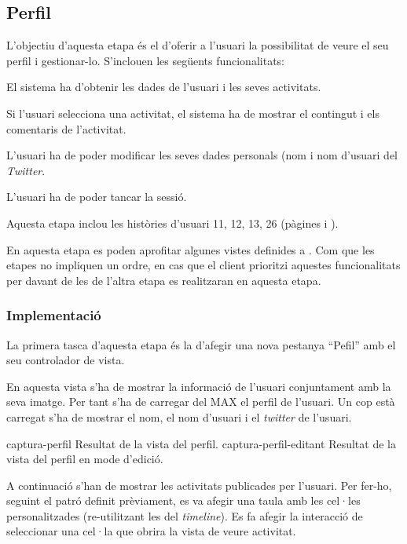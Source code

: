 \subsection{Perfil}

L'objectiu d'aquesta etapa és el d'oferir a l'usuari la possibilitat de veure el seu perfil i gestionar-lo.  S'inclouen les següents funcionalitats:

\begin{compactitem}
    \item El sistema ha d'obtenir les dades de l'usuari i les seves activitats.
    \item Si l'usuari selecciona una activitat, el sistema ha de mostrar el contingut i els comentaris de l'activitat.
    \item L'usuari ha de poder modificar les seves dades personals (nom i nom d'usuari del \textit{Twitter}.
    \item L'usuari ha de poder tancar la sessió.
\end{compactitem}

Aquesta etapa inclou les històries d'usuari 11, 12, 13, 26 (pàgines \pageref{sec:historia_11} i \pageref{sec:historia_26}).

En aquesta etapa es poden aprofitar algunes vistes definides a . Com que les etapes no impliquen un ordre, en cas que el client prioritzi aquestes funcionalitats per davant de les de l'altra etapa es realitzaran en aquesta etapa.

\subsubsection{Implementació}

La primera tasca d'aquesta etapa és la d'afegir una nova pestanya ``Pefil'' amb el seu controlador de vista.

En aquesta vista s'ha de mostrar la informació de l'usuari conjuntament amb la seva imatge. Per tant s'ha de carregar del MAX el perfil de l'usuari. Un cop està carregat s'ha de mostrar el nom, el nom d'usuari i el \textit{twitter} de l'usuari.

\pintaDosImatges
    {captura-perfil}
        {Resultat de la vista del perfil.}
    {captura-perfil-editant}
        {Resultat de la vista del perfil en mode d'edició.}
        
A continuació s'han de mostrar les activitats publicades per l'usuari. Per fer-ho, seguint el patró definit prèviament, es va afegir una taula amb les cel·les personalitzades (re-utilitzant les del \textit{timeline}). Es fa afegir la interacció de seleccionar una cel·la que obrira la vista de veure activitat.


